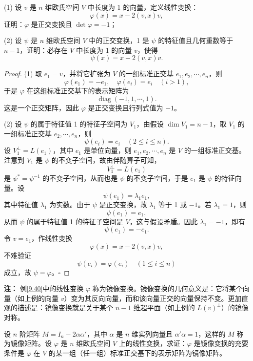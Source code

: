 \documentclass[lang=cn,12pt]{elegantbook}
\begin{document}
\begin{example}\label{9.40}
(1) 设 \( v \) 是 \( n \) 维欧氏空间 \( V \) 中长度为 1 的向量，定义线性变换：
\[
\varphi(x) = x - 2(v, x)v,
\]
证明：\( \varphi \) 是正交变换且 \( \det \varphi = -1 \)；

(2) 设 \( \psi \) 是 \( n \) 维欧氏空间 \( V \) 中的正交变换，1 是 \( \psi \) 的特征值且几何重数等于 \( n-1 \)，证明：必存在 \( V \) 中长度为 1 的向量 \( v \)，使得
\[
\psi(x) = x - 2(v, x)v.
\]
\end{example}

\begin{proof}
(1) 取 \( e_1 = v \)，并将它扩张为 \( V \) 的一组标准正交基 \( e_1, e_2, \cdots, e_n \)，则
\[
\varphi(e_1) = -e_1, \quad \varphi(e_i) = e_i \quad (i > 1),
\]
于是 \( \varphi \) 在这组标准正交基下的表示矩阵为
\[
\operatorname{diag}(-1, 1, \cdots, 1).
\]
这是一个正交矩阵，因此 \( \varphi \) 是正交变换且行列式值为 \(-1\)。

(2) 设 \( \psi \) 的属于特征值 1 的特征子空间为 \( V_1 \)，由假设 \( \dim V_1 = n-1 \)，取 \( V_1 \) 的一组标准正交基 \( e_2, \cdots, e_n \)，则
\[
\psi(e_i) = e_i \quad (2 \leq i \leq n).
\]
设 \( V_1^\perp = L(e_1) \)，其中 \( e_1 \) 是单位向量，则 \( e_1, e_2, \cdots, e_n \) 是 \( V \) 的一组标准正交基。注意到 \( V_1 \) 是 \( \psi \) 的不变子空间，故由伴随算子可知，
\[
V_1^\perp = L(e_1)
\]
是 \( \psi^* = \psi^{-1} \) 的不变子空间，从而也是 \( \psi \) 的不变子空间，于是 \( e_1 \) 是 \( \psi \) 的特征向量。设
\[
\psi(e_1) = \lambda_1 e_1,
\]
其中特征值 \( \lambda_1 \) 为实数。由于 \( \psi \) 是正交变换，故 \( \lambda_1 \) 等于 1 或 \(-1\)。若 \( \lambda_1 = 1 \)，则
\[
\psi(e_1) = e_1,
\]
从而 \( \psi \) 的属于特征值 1 的特征子空间是 \( V \)，这与假设矛盾。因此 \( \lambda_1 = -1 \)，即有
\[
\psi(e_1) = -e_1.
\]
令 \( v = e_1 \)，作线性变换
\[
\varphi(x) = x - 2(v, x)v,
\]
不难验证
\[
\psi(e_i) = \varphi(e_i) \quad (1 \leq i \leq n)
\]
成立，故 \( \psi = \varphi \)。\hfill\(\square\)
\end{proof}

\textbf{注：} 例\ref{9.40}中的线性变换 \( \varphi \) 称为镜像变换。镜像变换的几何意义是：它将某个向量（如上例的向量 \( v \)）变为其反向向量，而和该向量正交的向量保持不变。更加直观的描述是：镜像变换就是关于某个 \( n-1 \) 维超平面（如上例的 \( L(v)^\perp \)）的镜像对称。


\begin{example}\label{9.41}
设 \( n \) 阶矩阵 \( M = I_n - 2\alpha\alpha' \)，其中 \(\alpha\) 是 \( n \) 维实列向量且 \(\alpha'\alpha = 1\)，这样的 \( M \) 称为镜像矩阵。设 \(\varphi\) 是 \( n \) 维欧氏空间 \( V \) 上的线性变换，求证：\(\varphi\) 是镜像变换的充要条件是 \(\varphi\) 在 \( V \) 的某一组（任一组）标准正交基下的表示矩阵为镜像矩阵。
\end{example}
\end{document}

